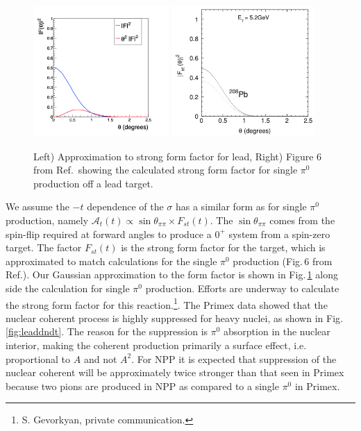  \begin{figure}[tbh]
\begin{center}
\includegraphics[height=5cm,clip=true]{figures/fit_Primakoff_sigma_c1.png}
\includegraphics[height=5cm,clip=true]{figures/PRC80_2009_Fig6.png}
\caption{ Left) Approximation to strong form factor for lead, Right) Figure 6 from Ref.\,\cite{Gevorkyan:2009ge} showing the calculated strong form factor for single $\pi^0$ production off a lead target.
\label{fig:strongFF}}
\end{center}
\end{figure}

We assume the $-t$ dependence of the $\sigma$ has a similar form as for single $\pi^0$ production, namely $\mathcal{A}_t(t) \propto \sin{\theta_{\pi\pi}} \times F_{st}(t)$.  The $\sin{\theta_{\pi\pi}}$ 
comes from the spin-flip required at forward angles to produce a $0^+$ system from a spin-zero target. The factor $F_{st}(t)$ is the strong form factor for the target, which is approximated to
match calculations for the single $\pi^0$ production (Fig.\,6 from Ref.\cite{Gevorkyan:2009ge}). Our Gaussian approximation to the form factor is shown in Fig.\,\ref{fig:strongFF} along side the calculation for single 
$\pi^0$ production. Efforts are underway to calculate the strong form factor for this reaction.\footnote{S. Gevorkyan, private communication.}.
The Primex data showed that the nuclear coherent process is highly
suppressed for heavy nuclei, as shown in Fig.\ref{fig:leaddndt}.  The reason for the suppression is
$\pi^0$ absorption in the nuclear interior, making the coherent
production primarily a surface effect, i.e. proportional to $A$ and
not $A^2$.  For NPP it is expected that suppression of the nuclear  
coherent will be approximately twice stronger than that seen in Primex because two pions
are produced in NPP as compared to a single $\pi^0$ in Primex. 

